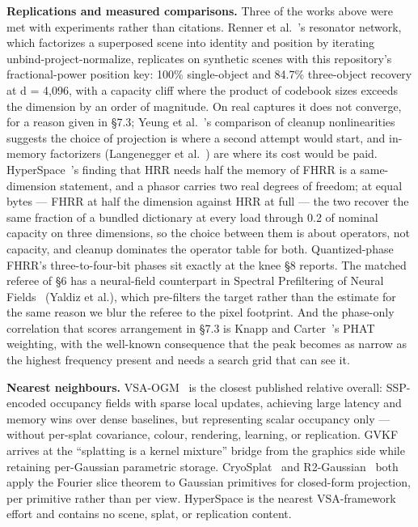 \documentclass[11pt]{article}
\begin{document}
\textbf{Replications and measured comparisons.} Three of the works above
were met with experiments rather than citations. Renner et
al.~\cite{renner2024resonator}'s resonator network, which factorizes a
superposed scene into identity and position by iterating
unbind-project-normalize, replicates on synthetic scenes with this
repository's fractional-power position key: 100\% single-object and
84.7\% three-object recovery at d = 4,096, with a capacity cliff where
the product of codebook sizes exceeds the dimension by an order of
magnitude. On real captures it does not converge, for a reason given in
\S7.3; Yeung et al.~\cite{yeung2026cleanup}'s comparison of cleanup
nonlinearities suggests the choice of projection is where a second
attempt would start, and in-memory factorizers (Langenegger et
al.~\cite{langenegger2023factorizer}) are where its cost would be paid.
HyperSpace~\cite{snyder2026hyperspace}'s finding that HRR needs half the
memory of FHRR is a same-dimension statement, and a phasor carries two
real degrees of freedom; at equal bytes --- FHRR at half the dimension
against HRR at full --- the two recover the same fraction of a bundled
dictionary at every load through 0.2 of nominal capacity on three
dimensions, so the choice between them is about operators, not capacity,
and cleanup dominates the operator table for both. Quantized-phase
FHRR's three-to-four-bit phases sit exactly at the knee \S8 reports. The
matched referee of \S6 has a neural-field counterpart in Spectral
Prefiltering of Neural Fields~\cite{yaldiz2025prefilter} (Yaldiz et
al.), which pre-filters the target rather than the estimate for the same
reason we blur the referee to the pixel footprint. And the phase-only
correlation that scores arrangement in \S7.3 is Knapp and
Carter~\cite{knapp1976gcc}'s PHAT weighting, with the well-known
consequence that the peak becomes as narrow as the highest frequency
present and needs a search grid that can see it.

\textbf{Nearest neighbours.} VSA-OGM~\cite{snyder2024vsaogm} is the
closest published relative overall: SSP-encoded occupancy fields with
sparse local updates, achieving large latency and memory wins over dense
baselines, but representing scalar occupancy only --- without per-splat
covariance, colour, rendering, learning, or replication.
GVKF~\cite{song2024gvkf} arrives at the ``splatting is a kernel
mixture'' bridge from the graphics side while retaining per-Gaussian
parametric storage. CryoSplat~\cite{chen2025cryosplat} and
R2-Gaussian~\cite{zha2024r2gaussian} both apply the Fourier slice
theorem to Gaussian primitives for closed-form projection, per primitive
rather than per view. HyperSpace is the nearest VSA-framework effort and
contains no scene, splat, or replication content.
\end{document}
